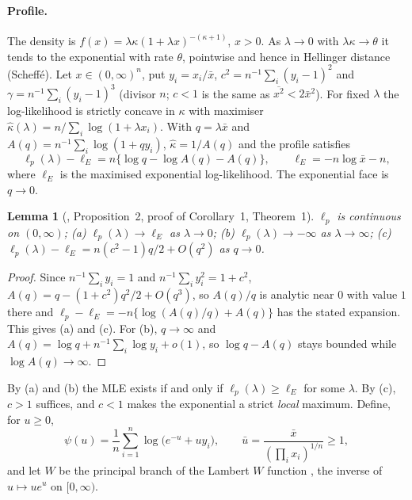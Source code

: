 \documentclass[11pt]{article}
\theoremstyle{plain}
\newtheorem{lemma}{Lemma}
\theoremstyle{definition}
\theoremstyle{remark}
\begin{document}
\paragraph{Profile.} The density is $f(x) = \lambda\kappa(1+\lambda
x)^{-(\kappa+1)}$, $x > 0$. As $\lambda\to0$ with $\lambda\kappa\to\theta$ it
tends to the exponential with rate $\theta$, pointwise and hence in Hellinger
distance (Scheff\'e). Let $x\in(0,\infty)^n$, put $y_i = x_i/\bar x$,
$c^2 = n^{-1}\sum_i (y_i-1)^2$ and $\gamma = n^{-1}\sum_i (y_i-1)^3$ (divisor
$n$; $c<1$ is the same as $\overline{x^2}<2\bar x^2$). For fixed $\lambda$
the log-likelihood is strictly concave in $\kappa$ with maximiser
$\hat\kappa(\lambda) = n/\sum_i\log(1+\lambda x_i)$. With $q = \lambda\bar x$
and $A(q) = n^{-1}\sum_i\log(1+q y_i)$, $\hat\kappa = 1/A(q)$ and the profile
satisfies
\begin{equation}
  \ell_p(\lambda) - \ell_E = n\{\log q - \log A(q) - A(q)\},
  \qquad \ell_E = -n\log\bar x - n ,
  \label{eq:lomax-profile}
\end{equation}
where $\ell_E$ is the maximised exponential log-likelihood. The exponential
face is $q\to0$.

\begin{lemma}[\cite{delcastillo2009}, Proposition~2, proof of Corollary~1, Theorem~1]\label{lem:lomax-profile}
$\ell_p$ is continuous on $(0,\infty)$; (a) $\ell_p(\lambda)\to\ell_E$ as
$\lambda\to0$; (b) $\ell_p(\lambda)\to-\infty$ as $\lambda\to\infty$; (c)
$\ell_p(\lambda) - \ell_E = n(c^2-1)q/2 + O(q^2)$ as $q\to0$.
\end{lemma}

\begin{proof}
Since $n^{-1}\sum_i y_i = 1$ and $n^{-1}\sum_i y_i^2 = 1+c^2$,
$A(q) = q - (1+c^2)q^2/2 + O(q^3)$, so $A(q)/q$ is analytic near $0$ with
value $1$ there and $\ell_p - \ell_E = -n\{\log(A(q)/q) + A(q)\}$ has the
stated expansion. This gives (a) and (c). For (b), $q\to\infty$ and
$A(q) = \log q + n^{-1}\sum_i\log y_i + o(1)$, so $\log q - A(q)$ stays
bounded while $\log A(q)\to\infty$.
\end{proof}

By (a) and (b) the MLE exists if and only if $\ell_p(\lambda)\ge\ell_E$ for
some $\lambda$. By (c), $c>1$ suffices, and $c<1$ makes the exponential a
strict \emph{local} maximum. Define, for $u\ge0$,
\[
  \psi(u) = \frac1n\sum_{i=1}^n\log\bigl(e^{-u} + u y_i\bigr),
  \qquad
  \bar u = \frac{\bar x}{(\prod_i x_i)^{1/n}} \ge 1 ,
\]
and let $W$ be the principal branch of the Lambert $W$ function
\cite{corless1996}, the inverse of $u\mapsto ue^u$ on $[0,\infty)$.
\end{document}
